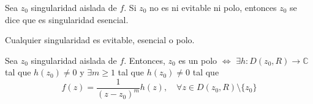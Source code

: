 \begin{defn}
  Sea $z_{0}$ singularidad aislada de $f$. Si $z_{0}$ no es ni evitable ni polo, entonces $z_{0}$ se dice que es singularidad esencial.
\end{defn}

\begin{obs}
  Cualquier singularidad es evitable, esencial o polo.
\end{obs}

\begin{prop}
  Sea $z_{0}$ singularidad aislada de $f$. Entonces, $z_{0}$ es un polo $\Leftrightarrow$ $\exists h : D(z_{0}, R) \to \mathbb{C}$ tal que $h(z_{0}) \neq 0$ y $\exists m \geq 1$ tal que $h(z_{0}) \neq 0$ tal que
  \[ 
    f(z) = \frac{1}{(z - z_{0})^{m}} h(z), \quad \forall z \in D(z_{0}, R) \setminus \{ z_{0} \} 
  \] 
\end{prop}
